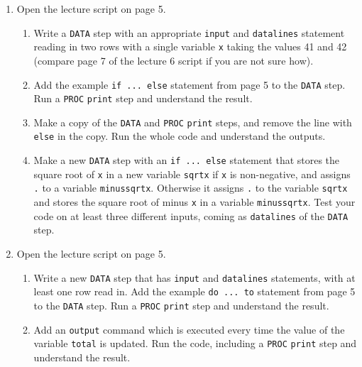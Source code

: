 \begin{enumerate}
\item Open the lecture script on page 5.
\begin{enumerate}
\item Write a \texttt{DATA} step with an appropriate \texttt{input} and \texttt{datalines} statement reading in two rows with a single variable \texttt{x} taking the values 41 and 42 (compare page 7 of the lecture 6 script if you are not sure how). 
\item Add the example \texttt{if ... else} statement from page 5 to the \texttt{DATA} step. Run a \texttt{PROC} \texttt{print} step and understand the result.
\item Make a copy of the \texttt{DATA} and \texttt{PROC} \texttt{print} steps, and remove the line with \texttt{else} in the copy. Run the whole code and understand the outputs.
\item Make a new \texttt{DATA} step with an \texttt{if ... else} statement that stores the square root of \texttt{x} in a new variable \texttt{sqrtx} if \texttt{x} is non-negative, and assigns \texttt{.} to a variable \texttt{minussqrtx}. Otherwise it assigns \texttt{.} to the variable \texttt{sqrtx} and stores the square root of minus \texttt{x} in a variable \texttt{minussqrtx}. Test your code on at least three different inputs, coming as \texttt{datalines} of the \texttt{DATA} step.
\end{enumerate}

\item Open the lecture script on page 5.
\begin{enumerate}
\item Write a new \texttt{DATA} step that has \texttt{input} and \texttt{datalines} statements, with at least one row read in. Add the example \texttt{do ... to} statement from page 5 to the \texttt{DATA} step. Run a \texttt{PROC} \texttt{print} step and understand the result.
\item Add an \texttt{output} command which is executed every time the value of the variable \texttt{total} is updated. Run the code, including a \texttt{PROC} \texttt{print} step and understand the result.
\end{enumerate}



\end{enumerate}
